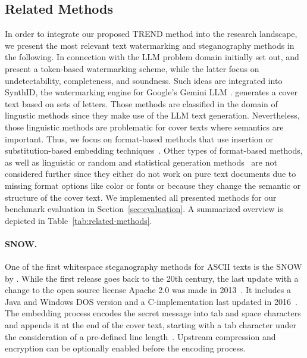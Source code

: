 	\subsection{Related Methods}
	\label{sec:related-methods}
	In order to integrate our proposed TREND method into the research landscape, we present the most relevant text watermarking and steganography methods in the following. In connection with the \ac{LLM} problem domain initially set out, \citet{Kirchenbauer.2023} and \citet{Christ.2024b} present a token-based watermarking scheme, while the latter focus on undetectability, completeness, and soundness. Such ideas are integrated into SynthID, the watermarking engine for Google's Gemini \ac{LLM} \citep{GoogleDeepMind.2024}. \citet{Steinebach.2024} generates a cover text based on sets of letters. Those methods are classified in the domain of lingustic methods since they make use of the \ac{LLM} text generation. Nevertheless, those linguistic methods are problematic for cover texts where semantics are important. Thus, we focus on format-based methods that use insertion or substitution-based embedding techniques~\citep{Knochel.2024}. Other types of format-based methods, as well as linguistic or random and statistical generation methods~\citep{Knochel.2024,Majeed.2021} are not considered further since they either do not work on pure text documents due to missing format options like color or fonts or because they change the semantic or structure of the cover text. We implemented all presented methods for our benchmark evaluation in Section~\ref{sec:evaluation}. A summarized overview is depicted in Table~\ref{tab:related-methods}.
	
	\paragraph{SNOW.} One of the first whitespace steganography methods for ASCII texts is the \ac{SNOW} by \citet{Kwan.2013}. While the first release goes back to the 20th century, the last update with a change to the open source license Apache 2.0 was made in 2013~\citep{Kwan.2013}. It includes a Java and Windows DOS version and a C-implementation last updated in 2016~\citep{Kwan.2016}. The embedding process encodes the secret message into tab and space characters and appends it at the end of the cover text, starting with a tab character under the consideration of a pre-defined line length~\citep{Kwan.2013}. Upstream compression and encryption can be optionally enabled before the encoding process.
	

